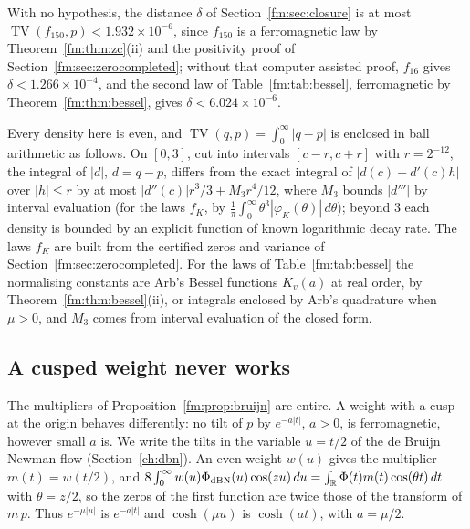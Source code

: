\begin{proposition}\label{fm:prop:tvcert}
With no hypothesis, the distance $\delta$ of Section~\ref{fm:sec:closure} is at most $\operatorname{TV}(f_{150},p)<1.932\times10^{-6}$, since $f_{150}$ is a ferromagnetic law by Theorem~\ref{fm:thm:zc}(ii) and the positivity proof of Section~\ref{fm:sec:zerocompleted}; without that computer assisted proof, $f_{16}$ gives $\delta<1.266\times10^{-4}$, and the second law of Table~\ref{fm:tab:bessel}, ferromagnetic by Theorem~\ref{fm:thm:bessel}, gives $\delta<6.024\times10^{-6}$.
\end{proposition}

Every density here is even, and $\operatorname{TV}(q,p)=\int_0^\infty|q-p|$ is enclosed in ball arithmetic as follows. On $[0,3]$, cut into intervals $[c-r,c+r]$ with $r=2^{-12}$, the integral of $|d|$, $d=q-p$, differs from the exact integral of $|d(c)+d'(c)h|$ over $|h|\le r$ by at most $|d''(c)|r^3/3+M_3r^4/12$, where $M_3$ bounds $|d'''|$ by interval evaluation (for the laws $f_K$, by $\frac1\pi\int_0^\infty\theta^3|\varphi_K(\theta)|\,d\theta$); beyond $3$ each density is bounded by an explicit function of known logarithmic decay rate. The laws $f_K$ are built from the certified zeros and variance of Section~\ref{fm:sec:zerocompleted}. For the laws of Table~\ref{fm:tab:bessel} the normalising constants are Arb's Bessel functions $K_v(a)$ at real order, by Theorem~\ref{fm:thm:bessel}(ii), or integrals enclosed by Arb's quadrature when $\mu>0$, and $M_3$ comes from interval evaluation of the closed form.

\subsection{A cusped weight never works}\label{sec:xg:cauchy}

The multipliers of Proposition~\ref{fm:prop:bruijn} are entire. A weight with a cusp at the origin behaves differently: no tilt of $p$ by $e^{-a|t|}$, $a>0$, is ferromagnetic, however small $a$ is. We write the tilts in the variable $u=t/2$ of the de Bruijn Newman flow (Section~\ref{ch:dbn}). An even weight $w(u)$ gives the multiplier $m(t)=w(t/2)$, and $8\int_0^\infty w(u)\Phi_{\rm dBN}(u)\cos(zu)\,du=\int_{\mathbb{R}}\Phi(t)m(t)\cos(\theta t)\,dt$ with $\theta=z/2$, so the zeros of the first function are twice those of the transform of $m\,p$. Thus $e^{-\mu|u|}$ is $e^{-a|t|}$ and $\cosh(\mu u)$ is $\cosh(at)$, with $a=\mu/2$.

